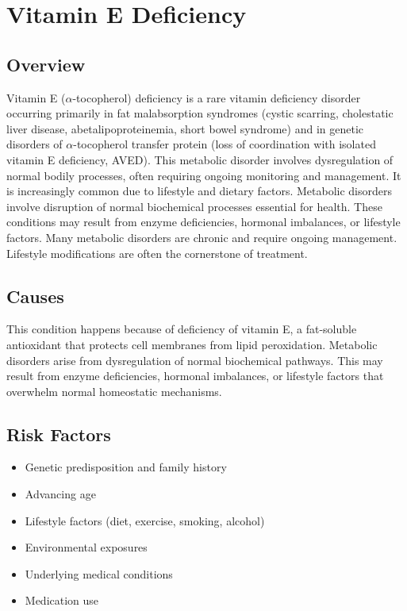 \chapter{Vitamin E Deficiency}
\label{sec:Vitamin E Deficiency}

\section{Overview}
Vitamin E ($\alpha$-tocopherol) deficiency is a rare vitamin deficiency disorder occurring primarily in fat malabsorption syndromes (cystic scarring, cholestatic liver disease, abetalipoproteinemia, short bowel syndrome) and in genetic disorders of $\alpha$-tocopherol transfer protein (loss of coordination with isolated vitamin E deficiency, AVED). This metabolic disorder involves dysregulation of normal bodily processes, often requiring ongoing monitoring and management. It is increasingly common due to lifestyle and dietary factors. Metabolic disorders involve disruption of normal biochemical processes essential for health. These conditions may result from enzyme deficiencies, hormonal imbalances, or lifestyle factors. Many metabolic disorders are chronic and require ongoing management. Lifestyle modifications are often the cornerstone of treatment.
\section{Causes}
This condition happens because of deficiency of vitamin E, a fat-soluble antioxidant that protects cell membranes from lipid peroxidation. Metabolic disorders arise from dysregulation of normal biochemical pathways. This may result from enzyme deficiencies, hormonal imbalances, or lifestyle factors that overwhelm normal homeostatic mechanisms.   
\section{Risk Factors}
\begin{itemize}[noitemsep]
  \item Genetic predisposition and family history
  \item Advancing age
  \item Lifestyle factors (diet, exercise, smoking, alcohol)
  \item Environmental exposures
  \item Underlying medical conditions
  \item Medication use
\end{itemize}
